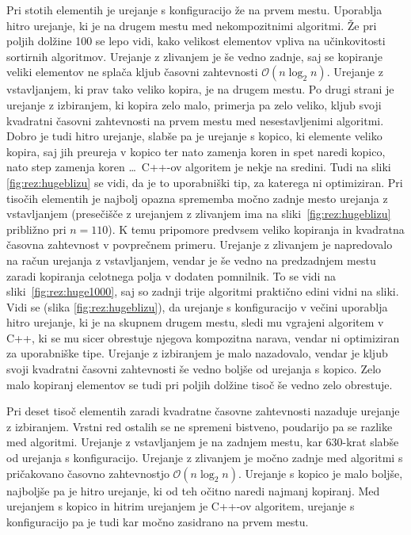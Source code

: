 \documentclass[a4paper,oneside,12pt]{article}
\begin{document}
Pri stotih elementih je urejanje s konfiguracijo že na prvem mestu. Uporablja
hitro urejanje, ki je na drugem mestu med nekompozitnimi algoritmi. Že pri
poljih dolžine 100 se lepo
vidi, kako velikost elementov vpliva na učinkovitosti sortirnih algoritmov.
Urejanje z zlivanjem je še vedno zadnje, saj se kopiranje veliki elementov ne
splača kljub časovni zahtevnosti $\mathcal{O}(n\log_2 n)$. Urejanje z
vstavljanjem, ki prav tako veliko kopira, je na drugem mestu. Po drugi strani je 
urejanje z izbiranjem, ki kopira zelo malo, primerja pa zelo veliko, 
kljub svoji kvadratni časovni zahtevnosti na prvem mestu med nesestavljenimi
algoritmi. Dobro je tudi hitro urejanje, slabše pa je urejanje s kopico, ki
elemente veliko kopira, saj jih preureja v kopico ter nato zamenja koren in spet
naredi kopico, nato step zamenja koren \dots\ \mbox{C++-ov} algoritem je nekje na sredini. Tudi na sliki
\ref{fig:rez:hugeblizu} se vidi, da je to
uporabniški tip, za katerega ni optimiziran.
Pri tisočih elementih je najbolj opazna sprememba močno zadnje mesto urejanja z
vstavljanjem (presečišče z urejanjem z zlivanjem ima na
sliki~\ref{fig:rez:hugeblizu} približno pri $n = 110$). K temu pripomore predvsem veliko kopiranja in kvadratna časovna
zahtevnost v povprečnem primeru. Urejanje z zlivanjem je napredovalo na račun
urejanja z vstavljanjem, vendar je še vedno na predzadnjem mestu zaradi
kopiranja celotnega polja v dodaten pomnilnik. To se vidi na
sliki~\ref{fig:rez:huge1000}, saj so zadnji trije algoritmi praktično edini
vidni na sliki.
Vidi se (slika \ref{fig:rez:hugeblizu}), da urejanje s
konfiguracijo v večini uporablja hitro urejanje, ki je na skupnem drugem mestu, 
sledi mu vgrajeni algoritem v C++, ki se mu sicer obrestuje njegova kompozitna
narava, vendar ni optimiziran za uporabniške tipe. 
Urejanje z izbiranjem je malo nazadovalo, vendar je kljub svoji kvadratni
časovni zahtevnosti še vedno boljše od urejanja s kopico.
Zelo malo kopiranj elementov se tudi pri poljih dolžine
tisoč še vedno zelo obrestuje.

Pri deset tisoč elementih zaradi kvadratne časovne zahtevnosti nazaduje urejanje
z izbiranjem. Vrstni red ostalih se ne spremeni bistveno, poudarijo pa se
razlike med algoritmi. 
Urejanje z vstavljanjem je na zadnjem mestu, kar 630-krat slabše od urejanja s
konfiguracijo. Urejanje z zlivanjem je močno zadnje
med algoritmi s pričakovano časovno zahtevnostjo $\mathcal{O}(n\log_2n)$. 
Urejanje s kopico je malo boljše, najboljše pa je hitro urejanje, ki od teh
očitno naredi najmanj kopiranj. Med urejanjem s kopico in hitrim urejanjem je
\mbox{C++-ov} algoritem, urejanje s konfiguracijo pa je tudi kar močno zasidrano na
prvem mestu.
\end{document}
